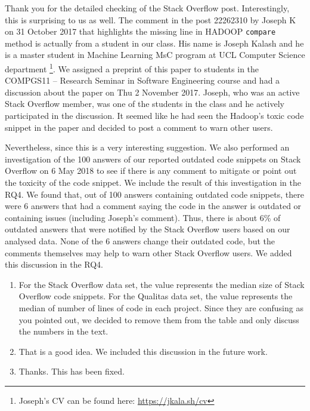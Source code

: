\documentclass[a4paper,twoside,10pt]{reviewresponse}
\begin{document}
Thank you for the detailed checking of the Stack Overflow post. Interestingly, this is surprising to us as well. The comment in the post 22262310 by Joseph K on 31 October 2017 that highlights the missing line in HADOOP \texttt{compare} method is actually from a student in our class. His name is Joseph Kalash and he is a master student in Machine Learning MsC program at UCL Computer Science department \footnote{Joseph's CV can be found here: \url{https://jkala.sh/cv}}. We assigned a preprint of this paper to students in the COMPGS11 -- Research Seminar in Software Engineering course and had a discussion about the paper on Thu 2 November 2017. Joseph, who was an active Stack Overflow member, was one of the students in the class and he actively participated in the discussion. It seemed like he had seen the Hadoop's toxic code snippet in the paper and decided to post a comment to warn other users.

Nevertheless, since this is a very interesting suggestion. We also performed an investigation of the 100 answers of our reported outdated code snippets on Stack Overflow on 6 May 2018 to see if there is any comment to mitigate or point out the toxicity of the code snippet. We include the result of this investigation in the RQ4. We found that, out of 100 answers containing outdated code snippets, there were 6 answers that had a comment saying the code in the answer is outdated or containing issues (including Joseph's comment). Thus, there is about 6\% of outdated answers that were notified by the Stack Overflow users based on our analysed data. None of the 6 answers change their outdated code, but the comments themselves may help to warn other Stack Overflow users. We added this discussion in the RQ4.


\begin{enumerate}
	\item For the Stack Overflow data set, the value represents the median size of Stack Overflow code snippets. For the Qualitas data set, the value represents the median of number of lines of code in each project. Since they are confusing as you pointed out, we decided to remove them from the table and only discuss the numbers in the text.
	\item That is a good idea. We included this discussion in the future work.
	\item Thanks. This has been fixed.
\end{enumerate}
\end{document}
